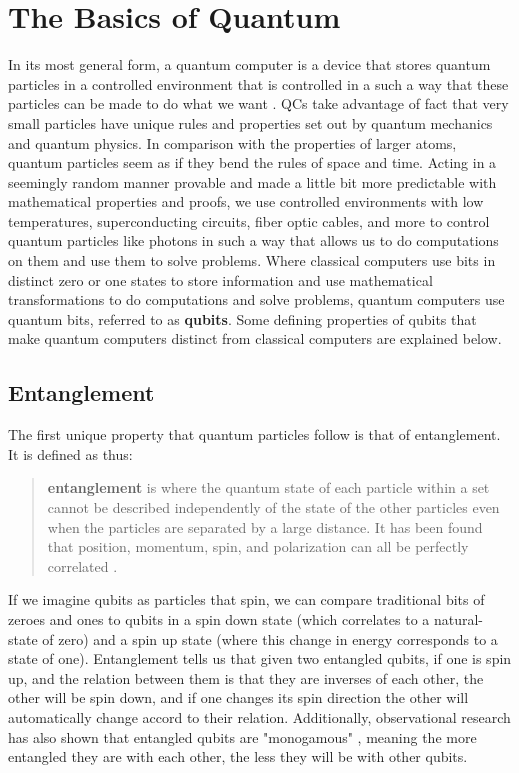 \graphicspath{{Images/}}

\section{The Basics of Quantum} \label{quantum_basics}
In its most general form, a quantum computer is a device that stores quantum particles in a controlled environment that is controlled in a such a way that these particles can be made to do what we want \cite{theunlockr}. QCs take advantage of fact that very small particles have unique rules and properties set out by quantum mechanics and quantum physics. In comparison with the properties of larger atoms, quantum particles seem as if they bend the rules of space and time. Acting in a seemingly random manner provable and made a little bit more predictable with mathematical properties and proofs, we use controlled environments with low temperatures, superconducting circuits, fiber optic cables, and more \cite{unc_qc} to control quantum particles like photons in such a way that allows us to do computations on them and use them to solve problems. Where classical computers use bits in distinct zero or one states to store information and use mathematical transformations to do computations and solve problems, quantum computers use quantum bits, referred to as \textbf{\glspl{qubit}}. Some defining properties of qubits that make quantum computers distinct from classical computers are explained below.  

    \subsection{Entanglement}
    The first unique property that quantum particles follow is that of entanglement. It is defined as thus: 
    \begin{quote}
        \textbf{\Gls{entanglement}} is where the quantum state of each particle within a set cannot be described independently of the state of the other particles even when the particles are separated by a large distance. It has been found that position, momentum, spin, and polarization can all be perfectly correlated \cite{entanglement}.
    \end{quote}

    If we imagine qubits as particles that spin, we can compare traditional bits of zeroes and ones to qubits in a spin down state (which correlates to a natural-state of zero) and a spin up state (where this change in energy corresponds to a state of one). Entanglement tells us that given two entangled qubits, if one is spin up, and the relation between them is that they are inverses of each other, the other will be spin down, and if one changes its spin direction the other will automatically change accord to their relation. Additionally, observational research has also shown that entangled qubits are "monogamous" \cite{info_is_quantum}, meaning the more entangled they are with each other, the less they will be with other qubits.
    

